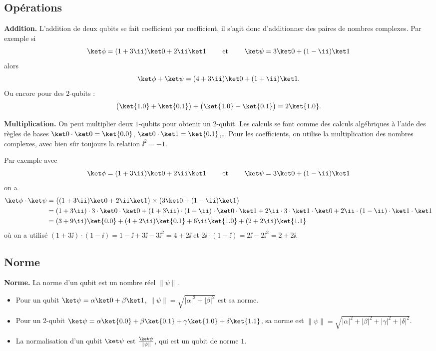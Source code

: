 \documentclass[11pt,class=report,crop=false]{standalone}
\begin{document}
\subsection{Opérations}


\textbf{Addition.}
L'addition de deux qubits se fait coefficient par coefficient,  il s'agit donc d'additionner des paires de nombres complexes. Par exemple
si 
$$\ket\phi = (1+3\ii)\ket0 + 2\ii\ket1 \qquad \text{ et } \qquad
\ket\psi = 3\ket0 + (1-\ii) \ket1$$
alors
$$\ket\phi + \ket\psi  = (4+3\ii)\ket0 + (1+\ii)\ket1.$$
Ou encore pour des $2$-qubits :
$$\big(\ket{1.0}+\ket{0.1}\big) + \big(\ket{1.0}-\ket{0.1}\big) = 2\ket{1.0}.$$

\bigskip
\textbf{Multiplication.}
On peut multiplier deux $1$-qubits pour obtenir un $2$-qubit. Les calculs se font comme des calculs algébriques à l'aide des règles de bases $\ket0 \cdot \ket 0 = \ket{0.0}$, $\ket0 \cdot \ket 1 = \ket{0.1}$,\ldots{} 
Pour les coefficients, on utilise la multiplication des nombres complexes, avec bien sûr toujours la relation $\ii^2=-1$.

Par exemple avec $$\ket\phi = (1+3\ii)\ket0 + 2\ii\ket1 \qquad \text{ et } \qquad
\ket\psi = 3\ket0 + (1-\ii) \ket1$$
on a
\begin{align*}
\ket\phi \cdot \ket\psi
  &=\big((1+3\ii)\ket0 + 2\ii\ket1\big) \times \big(3\ket0 + (1-\ii) \ket1\big) \\
  &= (1+3\ii)\cdot3\cdot\ket0\cdot\ket0 
  + (1+3\ii)\cdot(1-\ii)\cdot\ket0\cdot\ket1+
    2\ii\cdot 3\cdot\ket1\cdot\ket0 + 2\ii\cdot(1-\ii)\cdot \ket1\cdot\ket1\\
  &= (3+9\ii)\ket{0.0}  + (4+2\ii)\ket{0.1} + 6\ii\ket{1.0}+(2+2\ii)\ket{1.1}
\end{align*}
où on a utilisé $(1+3\ii) \cdot (1-\ii) = 1-\ii+3\ii-3\ii^2 = 4+2\ii$ et $2\ii\cdot(1-\ii) = 2\ii-2\ii^2 = 2+2\ii$.

\subsection{Norme}


\textbf{Norme.}
La norme d'un qubit est un nombre réel $\|\psi\|$.
\begin{itemize}
  \item Pour un qubit $\ket\psi = \alpha\ket0+\beta\ket1$, $\|\psi\| = \sqrt{|\alpha|^2+|\beta|^2}$ est sa norme.
  \item Pour un 2-qubit $\ket\psi = \alpha\ket{0.0}+\beta\ket{0.1}+\gamma\ket{1.0}+\delta\ket{1.1}$, sa norme est $\|\psi\| = \sqrt{|\alpha|^2+|\beta|^2+|\gamma|^2+|\delta|^2}$.
  \item La normalisation d'un qubit $\ket\psi$ est $\frac{\ket\psi}{\|\psi\|}$, qui  est un qubit de norme $1$.
\end{itemize}
\end{document}
